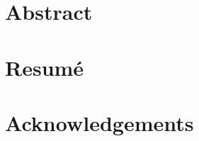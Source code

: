 \documentclass{report}
\begin{document}
  
   
  

\newpage
\section*{Abstract}


\newpage
\section*{Resumé}
 
 
\newpage 
\section*{Acknowledgements}

\newpage       
 
  
\tableofcontents   
\newpage      

% 
%  
% 
%  
% 


\end{document}
